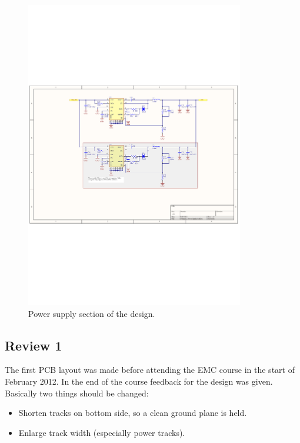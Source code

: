 \begin{figure}[H]
	\begin{centering}
		 \includegraphics[width=0.85\textwidth,page=1,angle=0]{images/SIG60_v0_4}
		\caption{Power supply section of the design.}
	\end{centering}
\end{figure}

\subsection{Review 1}
The first PCB layout was made before attending the EMC course in the start of February 2012. In the end of the course feedback for the design was given. Basically two things should be changed:
\begin{itemize}
	\item Shorten tracks on bottom side, so a clean ground plane is held. 
	\item Enlarge track width (especially power tracks).
\end{itemize}

